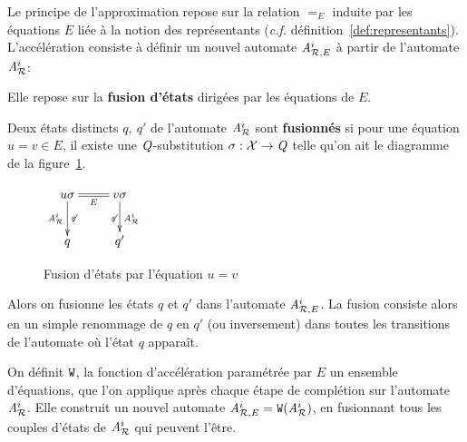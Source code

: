 Le principe de l'approximation repose sur la relation $=_E$ induite par les équations $E$ liée
à la notion des représentants (\textit{c.f.} définition~\ref{def:representants}). 
L'accélération consiste à définir un nouvel automate ${\mathit A}_{\mathcal R,E}^i$ à partir de l'automate ${\mathit A}_{\mathcal R}^i$:

Elle repose sur la \textbf{fusion d'états} dirigées par les équations de $E$.
\begin{definition}
  Deux états distincts $q,\ q'$ de l'automate ${\mathit A}_{\mathcal R}^i$ sont \textbf{fusionnés} si pour une équation $u=v \in E$,
  il existe une $\mathit Q$-substitution $\sigma : \mathcal X \rightarrow \mathit Q$ telle qu'on ait le diagramme de la figure~\ref{fig:fusion}.

  \begin{figure}[ht!]
    \centering
    $\xymatrix{
      u\sigma \ar@{=}[r]_{E}\ar[d]_{\aaex^i}^{\not\varepsilon} & v\sigma \ar[d]_{\not\varepsilon}^{\aaex^i}\\
      q & q'
    } $
    \caption{Fusion d'états par l'équation $u=v$}
    \label{fig:fusion}
  \end{figure}

  Alors on fusionne les états $q$ et $q'$ dans l'automate ${\mathit A}_{\mathcal R,E}^i$. 
  La fusion consiste alors en un simple renommage de $q$ en $q'$ (ou inversement) dans toutes
  les transitions de l'automate où l'état $q$ apparaît.
\end{definition}


\begin{definition}
  On définit $\mathtt{W}$, la fonction d'accélération paramétrée par $E$ un ensemble d'équations, 
  que l'on applique après chaque étape de complétion sur l'automate ${\mathit A}_{\mathcal R}^i$. Elle construit
  un nouvel automate ${\mathit A}_{\mathcal R,E}^i = \mathtt{W}({\mathit A}_{\mathcal R}^i)$, en fusionnant tous les couples d'états de ${\mathit A}_{\mathcal R}^i$
  qui peuvent l'être.
\end{definition}


